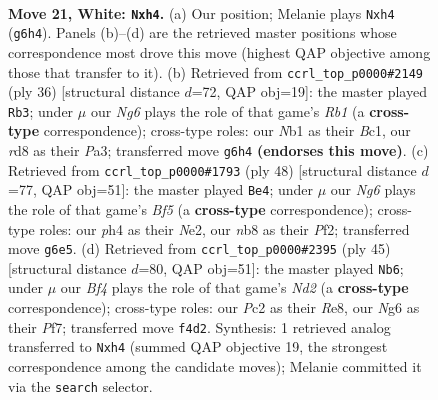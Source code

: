 \documentclass[11pt]{article}
\begin{document}
\clearpage

\begin{figure}[p]\centering
\begin{subfigure}{0.46\textwidth}\centering
\resizebox{\linewidth}{!}{%
\newchessgame
\chessboard[
  setfen={rn1r4/5kb1/2p1p1N1/6p1/p3nB1p/P7/RPP2PPP/1N2RK2 w - - 2 21},
  showmover=false,
  pgfstyle=straightmove, color=movearrow, markmove={g6-h4}
]}
\caption{}
\end{subfigure}\hfill
\begin{subfigure}{0.46\textwidth}\centering
\resizebox{\linewidth}{!}{%
\newchessgame
\chessboard[
  setfen={2kr1b1r/1pp2pp1/4pnnp/1N6/1P1PN1P1/P4P2/2P4P/1RB2RK1 w - - 1 19},
  showmover=false,
  pgfstyle=straightmove, color=movearrow, markmove={b1-b3}
]}
\caption{}
\end{subfigure}
\\[4pt]
\begin{subfigure}{0.46\textwidth}\centering
\resizebox{\linewidth}{!}{%
\newchessgame
\chessboard[
  setfen={1r1r4/pb3p2/5kp1/n3pB2/2p3P1/3P3R/PPP1NP1P/2R1K3 w - - 0 25},
  showmover=false,
  pgfstyle=straightmove, color=movearrow, markmove={f5-e4}
]}
\caption{}
\end{subfigure}\hfill
\begin{subfigure}{0.46\textwidth}\centering
\resizebox{\linewidth}{!}{%
\newchessgame
\chessboard[
  setfen={2r1r3/3n1pk1/p1nRb1pp/1p2p3/1P2P3/P1N1RN2/1KP3PP/5B2 b - - 0 23},
  showmover=false,
  pgfstyle=straightmove, color=movearrow, markmove={d7-b6}
]}
\caption{}
\end{subfigure}
\caption{\textbf{Move 21, White: \texttt{Nxh4}.} (a) Our position; Melanie plays \texttt{Nxh4} (\texttt{g6h4}). Panels (b)--(d) are the retrieved master positions whose correspondence most drove this move (highest QAP objective among those that transfer to it). (b) Retrieved from \texttt{ccrl\_top\_p0000\#2149} (ply 36) [structural distance $d$=72, QAP obj=19]: the master played \texttt{Rb3}; under $\mu$ our \emph{Ng6} plays the role of that game's \emph{Rb1} (a \textbf{cross-type} correspondence); cross-type roles: our \emph{N}b1 as their \emph{B}c1, our \emph{r}d8 as their \emph{P}a3; transferred move \texttt{g6h4} \textbf{(endorses this move)}. (c) Retrieved from \texttt{ccrl\_top\_p0000\#1793} (ply 48) [structural distance $d$=77, QAP obj=51]: the master played \texttt{Be4}; under $\mu$ our \emph{Ng6} plays the role of that game's \emph{Bf5} (a \textbf{cross-type} correspondence); cross-type roles: our \emph{p}h4 as their \emph{N}e2, our \emph{n}b8 as their \emph{P}f2; transferred move \texttt{g6e5}. (d) Retrieved from \texttt{ccrl\_top\_p0000\#2395} (ply 45) [structural distance $d$=80, QAP obj=51]: the master played \texttt{Nb6}; under $\mu$ our \emph{Bf4} plays the role of that game's \emph{Nd2} (a \textbf{cross-type} correspondence); cross-type roles: our \emph{P}c2 as their \emph{R}e8, our \emph{N}g6 as their \emph{P}f7; transferred move \texttt{f4d2}. Synthesis: 1 retrieved analog transferred to \texttt{Nxh4} (summed QAP objective 19, the strongest correspondence among the candidate moves); Melanie committed it via the \texttt{search} selector.}
\label{fig:thought-m40}
\end{figure}
\end{document}
